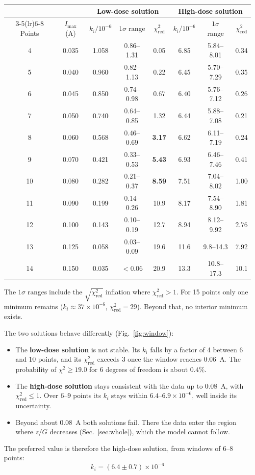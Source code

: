 \documentclass[11pt,a4paper]{article}
\newcommand{\kan}{k_i}
\begin{document}
\begin{center}
\small
\begin{tabular}{cc ccc ccc}
\toprule
 & & \multicolumn{3}{c}{Low-dose solution} & \multicolumn{3}{c}{High-dose solution}\\
\cmidrule(lr){3-5}\cmidrule(lr){6-8}
Points & $I_\text{max}$ (A) & $\kan/10^{-6}$ & $1\sigma$ range & $\chi^2_\text{red}$ & $\kan/10^{-6}$ & $1\sigma$ range & $\chi^2_\text{red}$\\
\midrule
4  & 0.035 & 1.058 & 0.86--1.31 & 0.05 & 6.85 & 5.84--8.01 & 0.34\\
5  & 0.040 & 0.960 & 0.82--1.13 & 0.22 & 6.45 & 5.70--7.29 & 0.35\\
6  & 0.045 & 0.850 & 0.74--0.98 & 0.67 & 6.40 & 5.76--7.12 & 0.26\\
7  & 0.050 & 0.740 & 0.64--0.85 & 1.32 & 6.44 & 5.88--7.08 & 0.21\\
8  & 0.060 & 0.568 & 0.46--0.69 & \textbf{3.17} & 6.62 & 6.11--7.19 & 0.24\\
9  & 0.070 & 0.421 & 0.33--0.53 & \textbf{5.43} & 6.93 & 6.46--7.46 & 0.41\\
10 & 0.080 & 0.282 & 0.21--0.37 & \textbf{8.59} & 7.51 & 7.04--8.02 & 1.00\\
11 & 0.090 & 0.199 & 0.14--0.26 & 10.9 & 8.17 & 7.54--8.90 & 1.81\\
12 & 0.100 & 0.143 & 0.10--0.19 & 12.7 & 8.94 & 8.12--9.92 & 2.76\\
13 & 0.125 & 0.058 & 0.03--0.09 & 19.6 & 11.6 & 9.8--14.3 & 7.92\\
14 & 0.150 & 0.035 & $<0.06$ & 20.9 & 13.3 & 10.8--17.3 & 10.1\\
\bottomrule
\end{tabular}
\end{center}
\noindent The $1\sigma$ ranges include the $\sqrt{\chi^2_\text{red}}$ inflation where $\chi^2_\text{red}>1$. For 15 points only one minimum remains ($\kan\approx 37\times10^{-6}$, $\chi^2_\text{red}=29$). Beyond that, no interior minimum exists.

The two solutions behave differently (Fig.~\ref{fig:window}):
\begin{itemize}
\item The \textbf{low-dose solution} is not stable. Its $\kan$ falls by a factor of 4 between 6 and 10 points, and its $\chi^2_\text{red}$ exceeds 3 once the window reaches $0.06$~A. The probability of $\chi^2 \ge 19.0$ for 6 degrees of freedom is about $0.4\%$.
\item The \textbf{high-dose solution} stays consistent with the data up to $0.08$~A, with $\chi^2_\text{red}\le1$. Over 6--9 points its $\kan$ stays within $6.4$--$6.9\times10^{-6}$, well inside its uncertainty.
\item Beyond about $0.08$~A both solutions fail. There the data enter the region where $z/G$ decreases (Sec.~\ref{sec:whole}), which the model cannot follow.
\end{itemize}
The preferred value is therefore the high-dose solution, from windows of 6--8 points:
\[
\boxed{\;\kan = (6.4\pm0.7)\times10^{-6}\;}
\]
\end{document}
